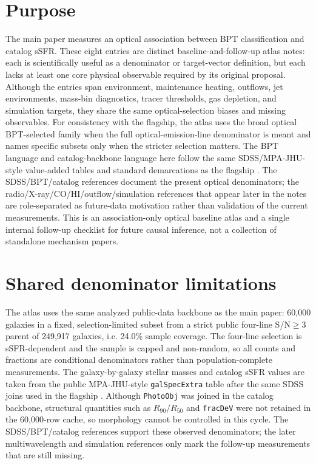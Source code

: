 \documentclass[twocolumn]{aastex631}
\begin{document}

\section{Purpose}
The main paper measures an optical association between BPT classification and catalog sSFR. These eight entries are distinct baseline-and-follow-up atlas notes: each is scientifically useful as a denominator or target-vector definition, but each lacks at least one core physical observable required by its original proposal. Although the entries span environment, maintenance heating, outflows, jet environments, mass-bin diagnostics, tracer thresholds, gas depletion, and simulation targets, they share the same optical-selection biases and missing observables. For consistency with the flagship, the atlas uses the broad optical BPT-selected family when the full optical-emission-line denominator is meant and names specific subsets only when the stricter selection matters. The BPT language and catalog-backbone language here follow the same SDSS/MPA-JHU-style value-added tables and standard demarcations as the flagship \citep{sdssdr17,brinchmann2004,york2000,baldwin1981,kewley2001,kauffmann2003bpt,kewley2006,stasinska2008,stasinska2015}. The SDSS/BPT/catalog references document the present optical denominators; the radio/X-ray/CO/HI/outflow/simulation references that appear later in the notes are role-separated as future-data motivation rather than validation of the current measurements. This is an association-only optical baseline atlas and a single internal follow-up checklist for future causal inference, not a collection of standalone mechanism papers.

\section{Shared denominator limitations}
The atlas uses the same analyzed public-data backbone as the main paper: 60,000 galaxies in a fixed, selection-limited subset from a strict public four-line S/N$\geq3$ parent of 249,917 galaxies, i.e. 24.0\% sample coverage. The four-line selection is sSFR-dependent and the sample is capped and non-random, so all counts and fractions are conditional denominators rather than population-complete measurements. The galaxy-by-galaxy stellar masses and catalog sSFR values are taken from the public MPA-JHU-style \texttt{galSpecExtra} table after the same SDSS joins used in the flagship \citep{sdssdr17,brinchmann2004,york2000}. Although \texttt{PhotoObj} was joined in the catalog backbone, structural quantities such as \(R_{90}/R_{50}\) and \texttt{fracDeV} were not retained in the 60,000-row cache, so morphology cannot be controlled in this cycle. The SDSS/BPT/catalog references support these observed denominators; the later multiwavelength and simulation references only mark the follow-up measurements that are still missing.
\end{document}
